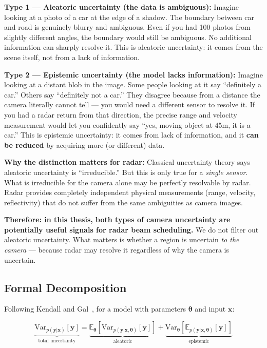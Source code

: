\documentclass[12pt, a4paper]{article}
\newcommand{\E}{\mathbb{E}}
\newcommand{\Var}{\mathrm{Var}}
\theoremstyle{definition}
\begin{document}
\begin{plainbox}
\textbf{Type 1 --- Aleatoric uncertainty (the data is ambiguous):}
Imagine looking at a photo of a car at the edge of a shadow.
The boundary between car and road is genuinely blurry and ambiguous.
Even if you had 100 photos from slightly different angles, the boundary would
still be ambiguous. No additional information can sharply resolve it.
This is aleatoric uncertainty: it comes from the scene itself, not from
a lack of information.

\textbf{Type 2 --- Epistemic uncertainty (the model lacks information):}
Imagine looking at a distant blob in the image.
Some people looking at it say ``definitely a car.''
Others say ``definitely not a car.'' They disagree because from a distance
the camera literally cannot tell --- you would need a different sensor to
resolve it. If you had a radar return from that direction, the precise range
and velocity measurement would let you confidently say ``yes, moving object
at 45m, it is a car.''
This is epistemic uncertainty: it comes from lack of information, and it
\textbf{can be reduced} by acquiring more (or different) data.

\textbf{Why the distinction matters for radar:}
Classical uncertainty theory says aleatoric uncertainty is ``irreducible.''
But this is only true for a \emph{single sensor}. What is irreducible for
the camera alone may be perfectly resolvable by radar. Radar provides
completely independent physical measurements (range, velocity, reflectivity)
that do not suffer from the same ambiguities as camera images.

\textbf{Therefore: in this thesis, both types of camera uncertainty are
potentially useful signals for radar beam scheduling.}
We do not filter out aleatoric uncertainty. What matters is whether
a region is uncertain \emph{to the camera} --- because radar may resolve
it regardless of why the camera is uncertain.
\end{plainbox}

\subsection{Formal Decomposition}

Following Kendall and Gal~\cite{kendall2017uncertainties}, for a model with
parameters $\boldsymbol{\theta}$ and input $\mathbf{x}$:

\begin{equation}
  \underbrace{\Var_{p(\mathbf{y}|\mathbf{x})}[\mathbf{y}]}_{\text{total uncertainty}}
  =
  \underbrace{
    \E_{\boldsymbol{\theta}}\!\left[
      \Var_{p(\mathbf{y}|\mathbf{x},\boldsymbol{\theta})}[\mathbf{y}]
    \right]
  }_{\text{aleatoric}}
  +
  \underbrace{
    \Var_{\boldsymbol{\theta}}\!\left[
      \E_{p(\mathbf{y}|\mathbf{x},\boldsymbol{\theta})}[\mathbf{y}]
    \right]
  }_{\text{epistemic}}
  \label{eq:uncertainty_decomp}
\end{equation}
\end{document}
